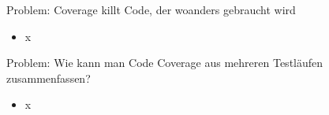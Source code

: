 \begin{frame}{Problem: Coverage killt Code, der woanders gebraucht wird}
\begin{itemize}
\item x
\end{itemize}
\end{frame}


\begin{frame}{Problem: Wie kann man Code Coverage aus mehreren Testläufen zusammenfassen?}
\begin{itemize}
\item x
\end{itemize}
\end{frame}



%


